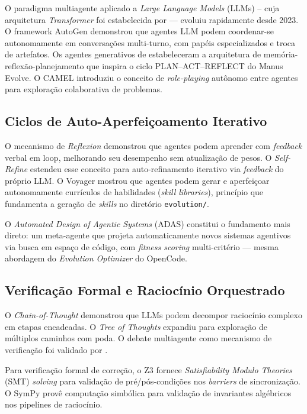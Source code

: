 \documentclass[
  article,
  12pt,
  oneside,
  a4paper,
  brazil,
  sumario=tradicional
]{abntex2}
\begin{document}
O paradigma multiagente aplicado a \emph{Large Language Models} (LLMs) -- cuja arquitetura \emph{Transformer} foi estabelecida por  --- evoluiu rapidamente desde 2023. O framework AutoGen \cite{wu2023autogen} demonstrou que agentes LLM podem coordenar-se autonomamente em conversações multi-turno, com papéis especializados e troca de artefatos. Os agentes generativos de  estabeleceram a arquitetura de memória-reflexão-planejamento que inspira o ciclo PLAN--ACT--REFLECT do Manus Evolve. O CAMEL \cite{li2023camel} introduziu o conceito de \emph{role-playing} autônomo entre agentes para exploração colaborativa de problemas.

\subsection{Ciclos de Auto-Aperfeiçoamento Iterativo}

O mecanismo de \emph{Reflexion} \cite{shinn2023reflexion} demonstrou que agentes podem aprender com \emph{feedback} verbal em loop, melhorando seu desempenho sem atualização de pesos. O \emph{Self-Refine} \cite{madaan2023selfrefine} estendeu esse conceito para auto-refinamento iterativo via \emph{feedback} do próprio LLM. O Voyager \cite{wang2023voyager} mostrou que agentes podem gerar e aperfeiçoar autonomamente currículos de habilidades (\emph{skill libraries}), princípio que fundamenta a geração de \emph{skills} no diretório \texttt{evolution/}.

O \emph{Automated Design of Agentic Systems} (ADAS) \cite{hu2024adas} constitui o fundamento mais direto: um meta-agente que projeta automaticamente novos sistemas agentivos via busca em espaço de código, com \emph{fitness scoring} multi-critério --- mesma abordagem do \emph{Evolution Optimizer} do OpenCode.

\subsection{Verificação Formal e Raciocínio Orquestrado}

O \emph{Chain-of-Thought} \cite{wei2022chainofthought} demonstrou que LLMs podem decompor raciocínio complexo em etapas encadeadas. O \emph{Tree of Thoughts} \cite{yao2023treeofthoughts} expandiu para exploração de múltiplos caminhos com poda. O debate multiagente como mecanismo de verificação foi validado por .

Para verificação formal de correção, o Z3 \cite{demoura2008z3} fornece \emph{Satisfiability Modulo Theories} (SMT) \emph{solving} para validação de pré/pós-condições nos \emph{barriers} de sincronização. O SymPy \cite{meurer2017sympy} provê computação simbólica para validação de invariantes algébricos nos pipelines de raciocínio.
\end{document}
